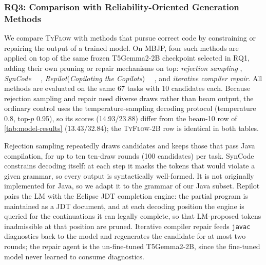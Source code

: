 \documentclass[manuscript,screen]{acmart}
\newcommand{\toolname}[1]{\textsc{#1}}
\newcommand{\mainname}{\toolname{TyFlow}\xspace}
\begin{document}
\subsubsection{RQ3: Comparison with    {\color{revblue}Reliability-Oriented Generation Methods} }
  {\color{revblue}We compare }\mainname{} {\color{revblue}with methods that pursue correct code by constraining or repairing the output of a trained model.
On MBJP, four such methods are applied on top of the same frozen T5Gemma2-2B checkpoint selected in RQ1, adding their own pruning or repair mechanisms on top: }\emph{\color{revblue}rejection sampling} ,    \emph{\color{revblue}SynCode}{\color{revblue}~\mbox{%
\cite{ugare2024syncodellmgenerationgrammar}}\hskip0pt%
, }\emph{\color{revblue}Repilot}{\color{revblue}(}\emph{\color{revblue}Copiloting the Copilots}{\color{revblue})~\mbox{%
\cite{DBLP:conf/sigsoft/0003X023}}\hskip0pt%
, and }\emph{\color{revblue}iterative compiler repair}{\color{revblue}.
All methods are evaluated on the same 67 tasks with 10 candidates each.
Because rejection sampling and repair need diverse draws rather than beam output, the ordinary control uses the temperature-sampling decoding protocol (temperature 0.8, top-$p$ 0.95), so its scores (14.93/23.88) differ from the beam-10 row of }\autoref{tab:model-results} {\color{revblue}(13.43/32.84); the }\mainname{\color{revblue}-2B row is identical in both tables.
}

{\color{revblue}Rejection sampling repeatedly draws candidates and keeps those that pass Java compilation, for up to ten ten-draw rounds (100 candidates) per task.
SynCode constrains decoding itself: at each step it masks the tokens that would violate a given grammar, so every output is syntactically well-formed. It is not originally implemented for Java, so we adapt it to the grammar of our Java subset.
Repilot pairs the LM with the Eclipse JDT completion engine: the partial program is maintained as a JDT document, and at each decoding position the engine is queried for the continuations it can legally complete, so that LM-proposed tokens inadmissible at that position are pruned.
Iterative compiler repair feeds }\texttt{\color{revblue}javac} {\color{revblue}diagnostics back to the model and regenerates the candidate for at most two rounds; the repair agent is the un-fine-tuned T5Gemma2-2B, since the fine-tuned model never learned to consume diagnostics.
}
\end{document}
